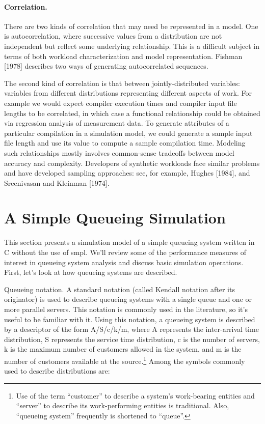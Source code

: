 \paragraph{Correlation.}
There are two kinds of correlation that may need be represented in a model. One
is autocorrelation, where successive values from a distribution are not
independent but reflect some underlying relationship. This is a difficult
subject in terms of both workload characterization and model representation.
Fishman [1978] describes two ways of generating autocorrelated sequences.

The second kind of correlation is that between jointly-distributed variables:
variables from different distributions representing different aspects of work.
For example we would expect compiler execution times and compiler input file
lengths to be correlated, in which case a functional relationship could be
obtained via regression analysis of measurement data. To generate attributes
of a particular compilation in a simulation model, we could generate a sample
input file length and use its value to compute a sample compilation time.
Modeling such relationships mostly involves common-sense tradeoffs between
model accuracy and complexity. Developers of synthetic workloads face similar
problems and have developed sampling approaches: see, for example, Hughes
[1984], and Sreenivasan and Kleinman [1974].

\section{A Simple Queueing Simulation}
\label{sec:simple-queueing-sim}

This section presents a simulation model of a simple queueing system written in
C without the use of smpl. We'll review some of the performance measures of
interest in queueing system analysis and discuss basic simulation operations.
First, let's look at how queueing systems are described.

Queueing notation. A standard notation (called Kendall notation after its
originator) is used to describe queueing systems with a single queue and one or
more parallel servers. This notation is commonly used in the literature, so
it's useful to be familiar with it. Using this notation, a queueing system is
described by a descriptor of the form A/S/c/k/m, where A represents the
inter-arrival time distribution, S represents the service time distribution, c
is the number of servers, k is the maximum number of customers allowed in the
system, and m is the number of customers available at the source.\footnote{Use
of the term ``customer'' to describe a system's work-bearing entities and
``server'' to describe its work-performing entities is traditional. Also,
``queueing system'' frequently is shortened to ``queue''.} Among the symbols
commonly used to describe distributions are:

